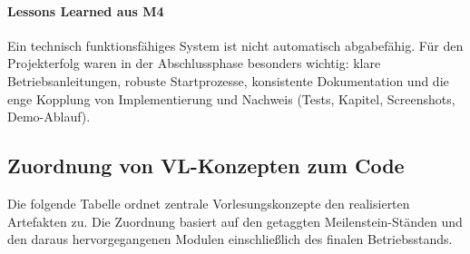 \paragraph{Lessons Learned aus M4}
Ein technisch funktionsfähiges System ist nicht automatisch
abgabefähig.
Für den Projekterfolg waren in der Abschlussphase besonders wichtig:
klare Betriebsanleitungen, robuste Startprozesse, konsistente Dokumentation und
die enge Kopplung von Implementierung und Nachweis (Tests, Kapitel, Screenshots,
Demo-Ablauf).

\subsection{Zuordnung von VL-Konzepten zum Code}

Die folgende Tabelle ordnet zentrale Vorlesungskonzepte den realisierten
Artefakten zu.
Die Zuordnung basiert auf den getaggten Meilenstein-Ständen und den daraus
hervorgegangenen Modulen einschließlich des finalen Betriebsstands.

